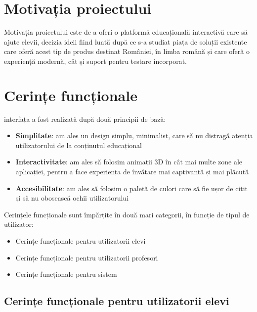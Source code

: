 \section{Motivația proiectului}
\label{sec:proj-motivation}

Motivația proiectului este de a oferi o platformă educațională interactivă care să ajute elevii, decizia ideii fiind luată după ce s-a studiat
piața de soluții existente care oferă acest tip de produs destinat României, în limba română și care oferă o experiență modernă, cât și suport pentru 
testare incorporat. 

\section{Cerințe funcționale}
\label{sec:proj-requirements}

interfața a fost realizată după două principii de bază:
\begin{itemize}
    \item \textbf{Simplitate}: am ales un design simplu, minimalist, care să nu distragă atenția utilizatorului de la conținutul educațional
    \item \textbf{Interactivitate}: am ales să folosim animații 3D în cât mai multe zone ale aplicației, pentru a face experiența de învățare mai captivantă și mai plăcută
    \item \textbf{Accesibilitate}: am ales să folosim o paletă de culori care să fie ușor de citit și să nu obosească ochii utilizatorului
\end{itemize}

Cerințele funcționale sunt împărțite în două mari categorii, în funcție de tipul de utilizator:
\begin{itemize}
    \item Cerințe funcționale pentru utilizatorii elevi
    \item Cerințe funcționale pentru utilizatorii profesori
    \item Cerințe funcționale pentru sistem
\end{itemize}

\subsection{Cerințe funcționale pentru utilizatorii elevi}
\label{sub-sec:proj-requirements-students}

